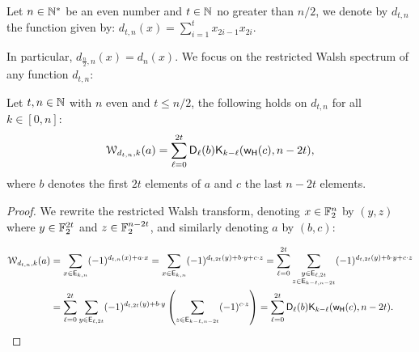 \documentclass[11pt]{llncs}
\begin{document}
\begin{definition}
	Let $n\in \N^*$ be an even number and $t \in \N $ no greater than $n/2$, we denote by $d_{t,n}$ the function given by: $d_{t,n}(x)=\sum_{i=1}^t x_{2i-1} x_{2i}$.
	
\end{definition}

In particular, $d_{\frac{n}{2},n}(x)=d_n(x)$. 
We focus on the restricted Walsh spectrum of any function $d_{t,n}$:

\begin{proposition}\label{proposition:dtn}
	Let $t, n\in \N$ with $n$ even and $t\le n/2$, the following holds on $d_{t,n}$ for all $k\in [0,n]$:
	\[\wtk{d_{t,n}}{k}(a)=\sum_{\ell=0}^{2t} \Dnka{2t}{\ell}{b} \kraw{k-\ell}{\w(c)}{n-2t},\]
	where $b$ denotes the first $2t$ elements of $a$ and $c$ the last $n-2t$ elements.
\end{proposition}
\begin{proof}
	We rewrite the restricted Walsh transform, denoting $x\in \F_2^n$ by $(y,z)$ where $y\in \F_2^{2t}$ and $z \in \F_2^{n-2t}$, and similarly denoting $a$ by $(b,c)$:
	

	\begin{align*}
\wtk{d_{t,n}}{k}(a)&=\sum_{x \in \Ekn{k}{n}} (-1)^{d_{t,n}(x)+a \cdot x}=\sum_{x \in \Ekn{k}{n}} (-1)^{d_{t,2t}(y)+b \cdot y +c \cdot z}=\sum_{\ell=0}^{2t} \sum_{\substack{y \in \Ekn{\ell}{2t}\\z \in \Ekn{k-\ell}{n-2t}}} (-1)^{d_{t,2t}(y)+b \cdot y +c \cdot z}\\
&=\sum_{\ell=0}^{2t} \sum_{y \in \Ekn{\ell}{2t}} (-1)^{d_{t,2t}(y)+b \cdot y} \left( \sum_{z \in \Ekn{k-\ell}{n-2t}} (-1)^{c \cdot z}\right)=\sum_{\ell=0}^{2t} \Dnka{2t}{\ell}{b} \kraw{k-\ell}{\w(c)}{n-2t}.\qedhere
\end{align*}	



\end{proof}
\end{document}
